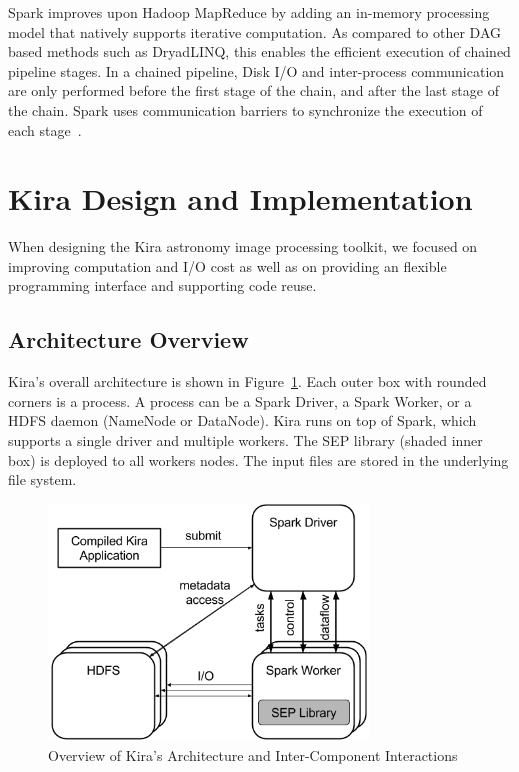 \documentclass[10pt,journal,compsoc]{IEEEtran}
\begin{document}
Spark improves upon
Hadoop MapReduce by adding an in-memory processing model that natively supports iterative computation. 
As compared to other DAG based methods such as DryadLINQ, this enables
the efficient execution of chained pipeline stages. In a chained pipeline,
Disk I/O and inter-process communication are only performed before the first stage of the chain, and after the
last stage of the chain. Spark uses communication barriers to synchronize the execution of each stage~\cite{zaharia12}.

\section{Kira Design and Implementation}
\label{sec:Design}

When designing the Kira astronomy image processing toolkit, 
we focused on improving computation and  I/O cost as well as on providing an flexible programming interface and supporting code reuse.

\subsection{Architecture Overview}
\label{sec:Design-Overview}

Kira's overall architecture is shown in Figure~\ref{fig:architecture}. 
Each outer box with rounded corners is a process. A process can be
a Spark Driver, a Spark Worker, or a HDFS daemon (NameNode or DataNode).
Kira runs on top of Spark, which supports a single driver and multiple workers.
The SEP library (shaded inner box) is deployed to all workers nodes. 
The input files are stored in the underlying file system.

\begin{figure}[t]
	\begin{center}
		\includegraphics[width=85mm]{pictures/Kira-Architecture}
		\caption{Overview of Kira's Architecture and Inter-Component Interactions}
		\label{fig:architecture}
  	\end{center}
\end{figure}
\end{document}
